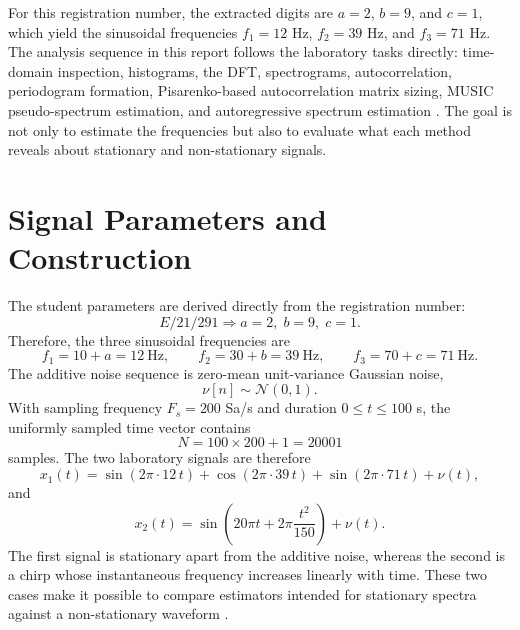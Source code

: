 \documentclass[12pt, a4paper]{article}
\begin{document}
For this registration number, the extracted digits are $a=2$, $b=9$, and $c=1$, which yield the sinusoidal frequencies $f_1=12$ Hz, $f_2=39$ Hz, and $f_3=71$ Hz. The analysis sequence in this report follows the laboratory tasks directly: time-domain inspection, histograms, the DFT, spectrograms, autocorrelation, periodogram formation, Pisarenko-based autocorrelation matrix sizing, MUSIC pseudo-spectrum estimation, and autoregressive spectrum estimation \cite{mitra2011, stoica2005}. The goal is not only to estimate the frequencies but also to evaluate what each method reveals about stationary and non-stationary signals.

\section{Signal Parameters and Construction}
The student parameters are derived directly from the registration number:
\begin{equation}
E/21/291 \Rightarrow a=2,\; b=9,\; c=1.
\end{equation}
Therefore, the three sinusoidal frequencies are
\begin{equation}
f_1 = 10 + a = 12\ \text{Hz}, \qquad
f_2 = 30 + b = 39\ \text{Hz}, \qquad
f_3 = 70 + c = 71\ \text{Hz}.
\end{equation}
The additive noise sequence is zero-mean unit-variance Gaussian noise,
\begin{equation}
\nu[n] \sim \mathcal{N}(0,1).
\end{equation}
With sampling frequency $F_s = 200$ Sa/s and duration $0 \le t \le 100$ s, the uniformly sampled time vector contains
\begin{equation}
N = 100 \times 200 + 1 = 20001
\end{equation}
samples. The two laboratory signals are therefore
\begin{equation}
x_1(t) = \sin(2\pi \cdot 12\, t) + \cos(2\pi \cdot 39\, t) + \sin(2\pi \cdot 71\, t) + \nu(t),
\end{equation}
and
\begin{equation}
x_2(t) = \sin\!\left(20\pi t + 2\pi \frac{t^2}{150}\right) + \nu(t).
\end{equation}
The first signal is stationary apart from the additive noise, whereas the second is a chirp whose instantaneous frequency increases linearly with time. These two cases make it possible to compare estimators intended for stationary spectra against a non-stationary waveform \cite{oppenheim2010, proakis2007}.
\end{document}
